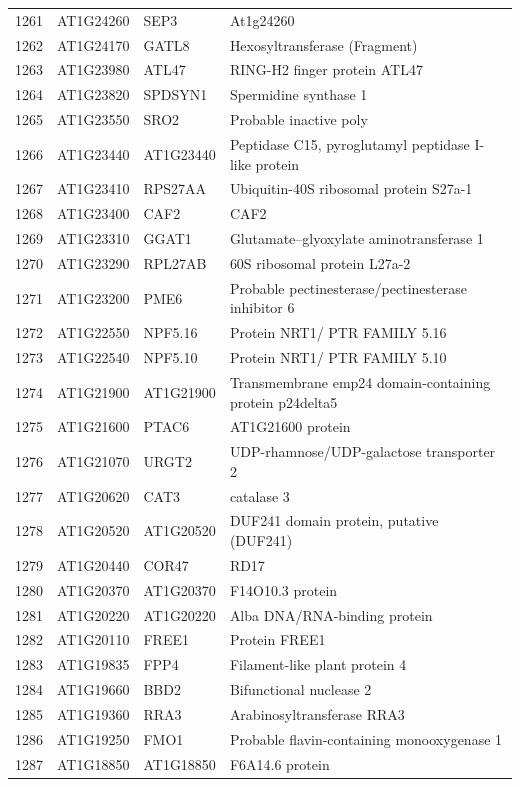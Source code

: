 \documentclass[11pt]{article}
\begin{document}
\begin{center}
\begin{tabular}{rlll}
1261 & AT1G24260 & SEP3 & At1g24260\\
1262 & AT1G24170 & GATL8 & Hexosyltransferase (Fragment)\\
1263 & AT1G23980 & ATL47 & RING-H2 finger protein ATL47\\
1264 & AT1G23820 & SPDSYN1 & Spermidine synthase 1\\
1265 & AT1G23550 & SRO2 & Probable inactive poly\\
1266 & AT1G23440 & AT1G23440 & Peptidase C15, pyroglutamyl peptidase I-like protein\\
1267 & AT1G23410 & RPS27AA & Ubiquitin-40S ribosomal protein S27a-1\\
1268 & AT1G23400 & CAF2 & CAF2\\
1269 & AT1G23310 & GGAT1 & Glutamate--glyoxylate aminotransferase 1\\
1270 & AT1G23290 & RPL27AB & 60S ribosomal protein L27a-2\\
1271 & AT1G23200 & PME6 & Probable pectinesterase/pectinesterase inhibitor 6\\
1272 & AT1G22550 & NPF5.16 & Protein NRT1/ PTR FAMILY 5.16\\
1273 & AT1G22540 & NPF5.10 & Protein NRT1/ PTR FAMILY 5.10\\
1274 & AT1G21900 & AT1G21900 & Transmembrane emp24 domain-containing protein p24delta5\\
1275 & AT1G21600 & PTAC6 & AT1G21600 protein\\
1276 & AT1G21070 & URGT2 & UDP-rhamnose/UDP-galactose transporter 2\\
1277 & AT1G20620 & CAT3 & catalase 3\\
1278 & AT1G20520 & AT1G20520 & DUF241 domain protein, putative (DUF241)\\
1279 & AT1G20440 & COR47 & RD17\\
1280 & AT1G20370 & AT1G20370 & F14O10.3 protein\\
1281 & AT1G20220 & AT1G20220 & Alba DNA/RNA-binding protein\\
1282 & AT1G20110 & FREE1 & Protein FREE1\\
1283 & AT1G19835 & FPP4 & Filament-like plant protein 4\\
1284 & AT1G19660 & BBD2 & Bifunctional nuclease 2\\
1285 & AT1G19360 & RRA3 & Arabinosyltransferase RRA3\\
1286 & AT1G19250 & FMO1 & Probable flavin-containing monooxygenase 1\\
1287 & AT1G18850 & AT1G18850 & F6A14.6 protein\\

\end{tabular}
\end{center}
\end{document}
